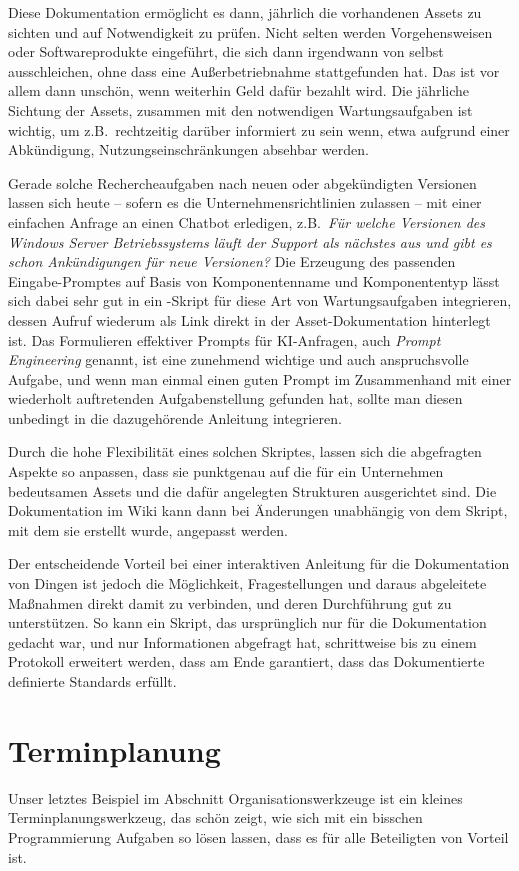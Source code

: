 Diese Dokumentation ermöglicht es dann, jährlich die vorhandenen Assets zu sichten und auf Notwendigkeit zu prüfen. Nicht selten werden Vorgehensweisen oder Softwareprodukte eingeführt, die sich dann irgendwann von selbst ausschleichen, ohne dass eine Außerbetriebnahme stattgefunden hat. Das ist vor allem dann unschön, wenn weiterhin Geld dafür bezahlt wird. Die jährliche Sichtung der Assets, zusammen mit den notwendigen Wartungsaufgaben ist wichtig, um z.B.\ rechtzeitig darüber informiert zu sein wenn, etwa aufgrund einer Abkündigung, Nutzungseinschränkungen absehbar werden.

Gerade solche Rechercheaufgaben nach neuen oder abgekündigten Versionen lassen sich heute -- sofern es die Unternehmensrichtlinien zulassen -- mit einer einfachen Anfrage an einen Chatbot erledigen, z.B.\
\emph{Für welche Versionen des Windows Server Betriebssystems läuft der Support als nächstes aus und gibt es schon Ankündigungen für neue Versionen?} Die Erzeugung des passenden Eingabe-Promptes auf Basis von Komponentenname und Komponententyp lässt sich dabei sehr gut in ein \FPZb-Skript für diese Art von Wartungsaufgaben integrieren, dessen Aufruf wiederum als Link direkt in der Asset-Dokumentation hinterlegt ist. Das Formulieren effektiver Prompts für KI-Anfragen, auch \emph{Prompt Engineering} genannt, ist eine zunehmend wichtige und auch anspruchsvolle Aufgabe, und wenn man einmal einen guten Prompt im Zusammenhand mit einer wiederholt auftretenden Aufgabenstellung gefunden hat, sollte man diesen unbedingt in die dazugehörende Anleitung integrieren.

Durch die hohe Flexibilität eines solchen Skriptes, lassen sich die abgefragten Aspekte so anpassen, dass sie punktgenau auf die für ein Unternehmen bedeutsamen Assets und die dafür angelegten Strukturen ausgerichtet sind. Die Dokumentation im Wiki kann dann bei Änderungen unabhängig von dem Skript, mit dem sie erstellt wurde, angepasst werden.

Der entscheidende Vorteil bei einer interaktiven Anleitung für die Dokumentation von Dingen ist jedoch die Möglichkeit, Fragestellungen und daraus abgeleitete Maßnahmen direkt damit zu verbinden, und deren Durchführung gut zu unterstützen. So kann ein Skript, das ursprünglich nur für die Dokumentation gedacht war, und nur Informationen abgefragt hat, schrittweise bis zu einem Protokoll erweitert werden, dass am Ende garantiert, dass das Dokumentierte definierte Standards erfüllt.

\section{Terminplanung}\label{Terminplanung}
Unser letztes Beispiel im Abschnitt Organisationswerkzeuge ist ein kleines Terminplanungswerkzeug, das schön zeigt, wie sich mit ein bisschen Programmierung Aufgaben so lösen lassen, dass es für alle Beteiligten von Vorteil ist.

